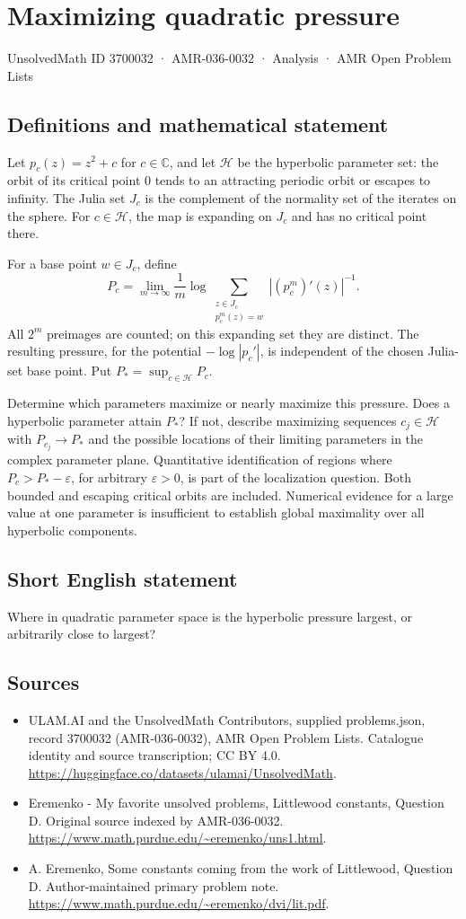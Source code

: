 \documentclass[11pt,a4paper]{article}
\begin{document}
\section*{Maximizing quadratic pressure}\label{3700032}
{\small UnsolvedMath ID 3700032 · AMR-036-0032 · Analysis · AMR Open Problem Lists}
\subsection{Definitions and mathematical statement}
Let $p_c(z)=z^2+c$ for $c\in\mathbb C$, and
let $\mathcal H$ be the hyperbolic parameter set:
the orbit of its critical point $0$ tends to
an attracting periodic orbit or escapes to infinity.
The Julia set $J_c$ is the complement of the
normality set of the iterates on the sphere.
For $c\in\mathcal H$, the map is expanding on
$J_c$ and has no critical point there.

For a base point $w\in J_c$, define
\[
 P_c=\lim_{m\to\infty}\frac1m\log
       \sum_{\substack{z\in J_c\\p_c^m(z)=w}}
                            |(p_c^m)'(z)|^{-1}.
\]
All $2^m$ preimages are counted; on this expanding
set they are distinct. The resulting pressure,
for the potential $-\log|p_c'|$, is independent
of the chosen Julia-set base point. Put
$P_*=\sup_{c\in\mathcal H}P_c$.

Determine which parameters maximize or nearly maximize
this pressure. Does a hyperbolic parameter attain
$P_*$? If not, describe maximizing sequences
$c_j\in\mathcal H$ with $P_{c_j}\to P_*$
and the possible locations of their limiting
parameters in the complex parameter plane.
Quantitative identification of regions where
$P_c>P_*-\varepsilon$, for arbitrary
$\varepsilon>0$, is part of the localization
question.
Both bounded and escaping critical orbits are
included. Numerical evidence for a large value
at one parameter is insufficient to establish
global maximality over all hyperbolic components.
\subsection{Short English statement}
Where in quadratic parameter space is the hyperbolic pressure largest, or arbitrarily close to largest?
\subsection{Sources}
\begin{itemize}
\item[S1] ULAM.AI and the UnsolvedMath Contributors, supplied problems.json, record 3700032 (AMR-036-0032), AMR Open Problem Lists. Catalogue identity and source transcription; CC BY 4.0.
\url{https://huggingface.co/datasets/ulamai/UnsolvedMath}.
\item[S2] Eremenko - My favorite unsolved problems, Littlewood constants, Question D. Original source indexed by AMR-036-0032.
\url{https://www.math.purdue.edu/~eremenko/uns1.html}.
\item[S3] A. Eremenko, Some constants coming from the work of Littlewood, Question D. Author-maintained primary problem note.
\url{https://www.math.purdue.edu/~eremenko/dvi/lit.pdf}.
\end{itemize}
\end{document}
